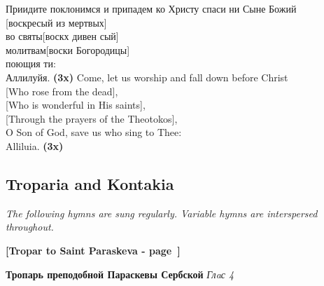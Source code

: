 \documentclass[twoside]{article}
\newcommand{\LITMOD}  [1]{\textbf{#1}} %
\newcommand{\LITTITLE}[1]{\textbf{#1}} %
\newcommand{\LITSUB}  [1]{\textit{#1}} %
\newcommand{\LITNOTE} [1]{\textit{#1}} %
\begin{document}
\begin{paracol}{2}
\begin{paracol}{2}
Приидите поклонимся
и припадем ко Христу спаси ни Сыне Божий\\
\-\hspace{2em}[воскресый из мертвых]\\
\-\hspace{2em}во святы[воскх дивен сый]\\
\-\hspace{2em}молитвам[воски Богородицы]\\
\-\hspace{2em}поющия ти:\\
\-\hspace{2em}Аллилуйя. \LITMOD{(3x)}
\switchcolumn
Come, let us worship
and fall down before Christ \\
\-\hspace{2em}[Who rose from the dead], \\
\-\hspace{2em}[Who is wonderful in His saints], \\
\-\hspace{2em}[Through the prayers of the Theotokos], \\
\-\hspace{2em}O Son of God, save us who sing to Thee:\\
\-\hspace{2em}Alliluia. \LITMOD{(3x)}
\end{paracol}

\subsection{Troparia and Kontakia}

\LITNOTE{The following hymns are sung regularly. Variable hymns are interspersed throughout.}

\LITTITLE{[Tropar to Saint Paraskeva - page~\pageref{Paraskeva_Tropar}]}\\

\begin{paracol}{2}
{
\LITTITLE{Тропарь преподобной Параскевы Сербской}
\LITSUB{Глaс 4}

}
\end{paracol}
\end{paracol}
\end{document}
